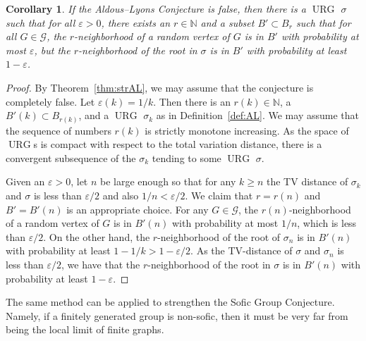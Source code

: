 \documentclass[12pt,a4paper]{article}
\newtheorem{Corollary}[Theorem]{Corollary}
\newcommand{\eps}{\varepsilon}
\newcommand{\G}{\mathcal{G}}
\newcommand{\N}{\mathbb{N}}
\renewcommand{\:}{\colon}
\DeclareMathOperator{\URG}{URG}
\begin{document}
\begin{Corollary}
If the Aldous--Lyons Conjecture is false, then there is a $\URG$ $\sigma$ such that for all $\eps > 0$, there exists an $r \in \N$ and a subset $B' \subset B_r$ such that for all $G \in \G$, the $r$-neighborhood of a random vertex of $G$ is in $B'$ with probability at most $\eps$, but the $r$-neighborhood of the root in $\sigma$ is in $B'$ with probability at least $1 - \eps$.
\end{Corollary}
\begin{proof}
By Theorem~\ref{thm:strAL}, we may assume that the conjecture is completely false. 
Let $\eps(k)=1/k$. 
Then there is an $r(k)\in \N$, a $B'(k)\subset B_{r(k)}$, and a $\URG$ $\sigma_k$ as in Definition~\ref{def:AL}. 
We may assume that the sequence of numbers $r(k)$ is strictly monotone increasing. 
As the space of $\URG$s is compact with respect to the total variation distance, there is a convergent subsequence of the $\sigma_k$ tending to some $\URG$ $\sigma$. 

Given an $\eps>0$, let $n$ be large enough so that for any $k\geq n$ the TV distance of $\sigma_k$ and $\sigma$ is less than $\eps/2$ and also $1/n<\eps/2$. 
We claim that $r=r(n)$ and $B'=B'(n)$ is an appropriate choice. 
For any $G \in \G$, the $r(n)$-neighborhood of a random vertex of $G$ is in $B'(n)$ with probability at most $1/n$, which is less than $\eps/2$. 
On the other hand, the $r$-neighborhood of the root of $\sigma_n$ is in $B'(n)$ with probability at least $1 - 1/k> 1-\eps/2$. 
As the TV-distance of $\sigma$ and $\sigma_n$ is less than $\eps/2$, we have that the $r$-neighborhood of the root in $\sigma$ is in $B'(n)$ with probability at least $1 - \eps$. 
\end{proof}

The same method can be applied to strengthen the Sofic Group Conjecture. 
Namely, if a finitely generated group is non-sofic, then it must be very far from being the local limit of finite graphs. 
\end{document}
